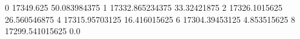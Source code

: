 0 17349.625 50.083984375
1 17332.865234375 33.32421875
2 17326.1015625 26.560546875
4 17315.95703125 16.416015625
6 17304.39453125 4.853515625
8 17299.541015625 0.0
